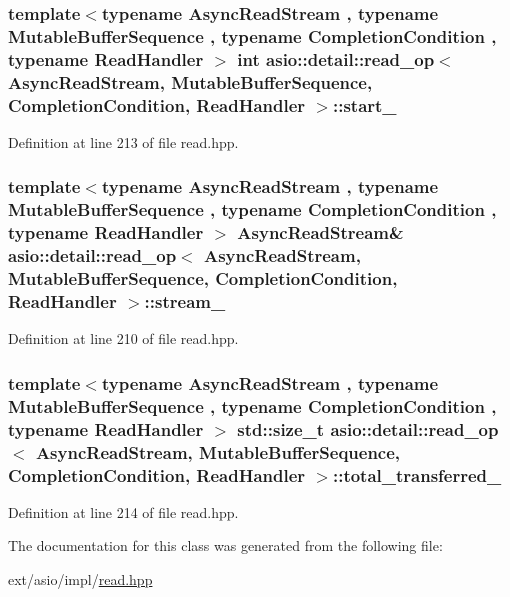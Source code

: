 \subsubsection[{start\+\_\+}]{\setlength{\rightskip}{0pt plus 5cm}template$<$typename Async\+Read\+Stream , typename Mutable\+Buffer\+Sequence , typename Completion\+Condition , typename Read\+Handler $>$ int {\bf asio\+::detail\+::read\+\_\+op}$<$ Async\+Read\+Stream, Mutable\+Buffer\+Sequence, Completion\+Condition, Read\+Handler $>$\+::start\+\_\+}\label{classasio_1_1detail_1_1read__op_a5ca22131fe58d48d2d61baf61c0f7de5}


Definition at line 213 of file read.\+hpp.

\hypertarget{classasio_1_1detail_1_1read__op_a4dee3c0e9c3d6ab702df6ded4bd1573b}{}
\subsubsection[{stream\+\_\+}]{\setlength{\rightskip}{0pt plus 5cm}template$<$typename Async\+Read\+Stream , typename Mutable\+Buffer\+Sequence , typename Completion\+Condition , typename Read\+Handler $>$ Async\+Read\+Stream\& {\bf asio\+::detail\+::read\+\_\+op}$<$ Async\+Read\+Stream, Mutable\+Buffer\+Sequence, Completion\+Condition, Read\+Handler $>$\+::stream\+\_\+}\label{classasio_1_1detail_1_1read__op_a4dee3c0e9c3d6ab702df6ded4bd1573b}


Definition at line 210 of file read.\+hpp.

\hypertarget{classasio_1_1detail_1_1read__op_a1eeb44229a1aea0b34bbe79da9f746d4}{}
\subsubsection[{total\+\_\+transferred\+\_\+}]{\setlength{\rightskip}{0pt plus 5cm}template$<$typename Async\+Read\+Stream , typename Mutable\+Buffer\+Sequence , typename Completion\+Condition , typename Read\+Handler $>$ std\+::size\+\_\+t {\bf asio\+::detail\+::read\+\_\+op}$<$ Async\+Read\+Stream, Mutable\+Buffer\+Sequence, Completion\+Condition, Read\+Handler $>$\+::total\+\_\+transferred\+\_\+}\label{classasio_1_1detail_1_1read__op_a1eeb44229a1aea0b34bbe79da9f746d4}


Definition at line 214 of file read.\+hpp.



The documentation for this class was generated from the following file\+:\begin{DoxyCompactItemize}
\item 
ext/asio/impl/\hyperlink{impl_2read_8hpp}{read.\+hpp}\end{DoxyCompactItemize}
